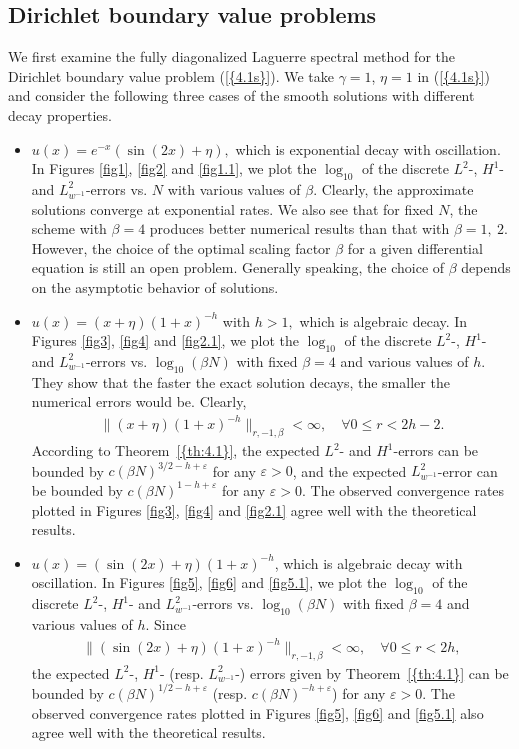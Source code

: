 \documentclass[10pt,reqno]{amsart}
\theoremstyle{remark}
\theoremstyle{definition}
\begin{document}
\subsection{Dirichlet boundary value  problems}
We first  examine  the fully diagonalized Laguerre spectral method for the Dirichlet boundary value problem
 {{\rm (\ref{{4.1s}})}}.   We take $\gamma=1$, $\eta=1$ in {{\rm (\ref{{4.1s}})}} and consider the following  three cases
of the smooth solutions with different decay properties.
 \begin{itemize}
\item $u(x)=e^{-x}(\sin(2x)+\eta),$ which is exponential decay with oscillation.
In Figures \ref{fig1}, \ref{fig2} and \ref{fig1.1}, we plot the
$\log_{10}$ of the discrete $L^2$-, $H^1$- and $L^2_{w^{-1}}$-errors
vs. $N$ with various values of $\beta$. Clearly, the approximate
solutions converge at exponential rates. We also see that for fixed
$N$, the scheme with $\beta=4$ produces better numerical results
than that with $\beta=1,~2.$ However, the choice of the optimal
scaling factor $\beta$ for a given differential equation is still an
open problem. Generally speaking, the choice of $\beta$ depends on
the asymptotic behavior of solutions.

\item $u(x)=(x+\eta)(1+x)^{-h}$ with $h>1,$ which is
algebraic decay. In Figures \ref{fig3}, \ref{fig4} and \ref{fig2.1},
we plot the $\log_{10}$ of the discrete $L^2$-, $H^1$- and
$L^2_{w^{-1}}$-errors vs. $\log_{10} (\beta N)$ with fixed ${\beta}=4$
and various values of $h$. They show that the faster the exact
solution decays, the smaller the numerical errors would be. Clearly,
\begin{align*}
 \|(x+\eta)(1+x)^{-h}\|_{r,-1,\beta}<\infty,\quad \forall 0\le  r<2h-2.
\end{align*}
According to {Theorem~{\rm \ref{{th:4.1}}}}, the expected $L^2$- and $H^1$-errors can
be bounded by $c(\beta N)^{3/2-h+\varepsilon}$ for any
$\varepsilon>0$, and the expected $L^2_{w^{-1}}$-error can be
bounded by $c(\beta N)^{1-h+\varepsilon}$ for any $\varepsilon>0$.
The observed convergence rates plotted in Figures \ref{fig3},
\ref{fig4} and \ref{fig2.1} agree well with the theoretical results.
\item $u(x)=(\sin(2x)+\eta)(1+x)^{-h}$, which is
algebraic decay with oscillation. In Figures \ref{fig5}, \ref{fig6}
and \ref{fig5.1}, we plot the $\log_{10}$ of the discrete $L^2$-,
$H^1$- and $L^2_{w^{-1}}$-errors vs. $\log_{10} (\beta N)$ with
fixed ${\beta}=4$ and various values of $h$.
Since
\begin{align*}
 \|(\sin(2x)+\eta)(1+x)^{-h}\|_{r,-1,\beta}<\infty,\quad \forall 0\le  r<2h,
\end{align*}
the expected $L^2$-, $H^1$- (resp. $L^2_{w^{-1}}$-) errors  given by
{Theorem~{\rm \ref{{th:4.1}}}} can be bounded by $c(\beta N)^{1/2-h+\varepsilon}$
(resp. $c(\beta N)^{-h+\varepsilon}$) for any $\varepsilon>0$. The
observed convergence rates plotted in Figures \ref{fig5}, \ref{fig6}
and \ref{fig5.1} also agree well with the theoretical results.
\end{itemize}
\end{document}
